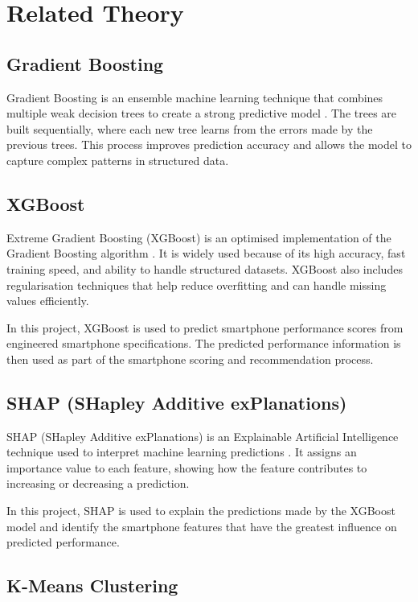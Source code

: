 \documentclass[12pt]{report}
\numberwithin{figure}{chapter}
\numberwithin{table}{chapter}
\numberwithin{equation}{chapter}
\begin{document}
\section{Related Theory}

\subsection{Gradient Boosting}

Gradient Boosting is an ensemble machine learning technique that combines multiple weak decision trees to create a strong predictive model \cite{friedman}. The trees are built sequentially, where each new tree learns from the errors made by the previous trees. This process improves prediction accuracy and allows the model to capture complex patterns in structured data.

\subsection{XGBoost}

Extreme Gradient Boosting (XGBoost) is an optimised implementation of the Gradient Boosting algorithm \cite{chen}. It is widely used because of its high accuracy, fast training speed, and ability to handle structured datasets. XGBoost also includes regularisation techniques that help reduce overfitting and can handle missing values efficiently.

In this project, XGBoost is used to predict smartphone performance scores from engineered smartphone specifications. The predicted performance information is then used as part of the smartphone scoring and recommendation process.

\subsection{SHAP (SHapley Additive exPlanations)}

SHAP (SHapley Additive exPlanations) is an Explainable Artificial Intelligence technique used to interpret machine learning predictions \cite{lundberg}. It assigns an importance value to each feature, showing how the feature contributes to increasing or decreasing a prediction.

In this project, SHAP is used to explain the predictions made by the XGBoost model and identify the smartphone features that have the greatest influence on predicted performance.

\subsection{K-Means Clustering}
\end{document}
